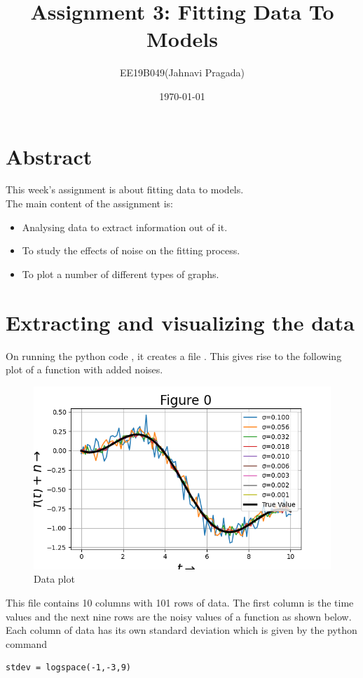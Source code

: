 \documentclass[11pt, a4paper]{article}
\title{Assignment 3: Fitting Data To Models} %
\author{EE19B049(Jahnavi Pragada)} %
\date{\today} %
\begin{document}
	
		
\maketitle %
\section*{Abstract}
This week's assignment is about fitting data to models.\\
The main content of the assignment is: 
\begin{itemize}
\item Analysing data to extract information out of it.
\item To study the effects of noise on the fitting process.
\item To plot a number of different types of graphs. 
\end{itemize}

\section{Extracting and visualizing the data}
On running the python code \textit{}, it creates a file \textit{}. This gives rise to the following plot of a function with added noises.

   \begin{figure}[!tbh]
   	\centering
   	\includegraphics[scale=0.6]{Figure_0.png}   
   	\caption{Data plot}
   	\label{fig:sample}
   \end{figure} 
   This file contains 10 columns with 101 rows of data. The first column is the time values and the next nine rows are the noisy values of a function as shown below. Each column of data has its own standard deviation which is given by the python command
\begin{verbatim}	
stdev = logspace(-1,-3,9)
\end{verbatim}
\end{document}
